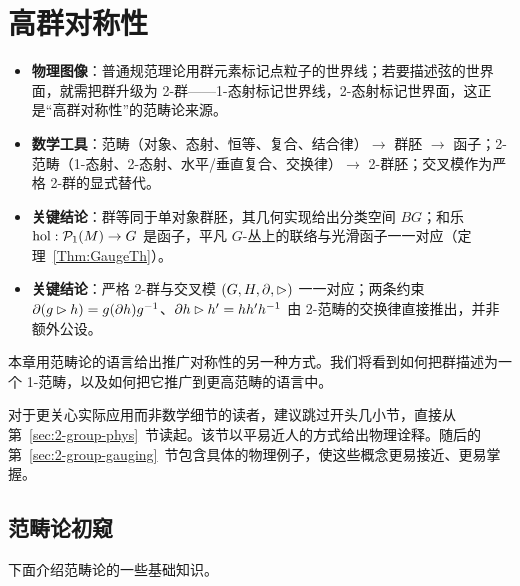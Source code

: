 
\section{高群对称性}\label{sec:higher-group}

\begin{keytakeaways}
  \begin{itemize}[leftmargin=1.4em,itemsep=2pt,topsep=2pt]
    \item \textbf{物理图像}：普通规范理论用群元素标记点粒子的世界线；若要描述弦的世界面，就需把群升级为 2-群——1-态射标记世界线，2-态射标记世界面，这正是“高群对称性”的范畴论来源。
    \item \textbf{数学工具}：范畴（对象、态射、恒等、复合、结合律）$\to$ 群胚 $\to$ 函子；2-范畴（1-态射、2-态射、水平/垂直复合、交换律）$\to$ 2-群胚；交叉模作为严格 2-群的显式替代。
    \item \textbf{关键结论}：群等同于单对象群胚，其几何实现给出分类空间 $BG$；和乐 ${\rm hol}:\mathcal{P}_1(M)\to G$ 是函子，平凡 $G$-丛上的联络与光滑函子一一对应（定理~\ref{Thm:GaugeTh}）。
    \item \textbf{关键结论}：严格 2-群与交叉模 $(G,H,\partial,\rhd)$ 一一对应；两条约束 $\partial(g\rhd h)=g(\partial h)g^{-1}$、$\partial h\rhd h'=hh'h^{-1}$ 由 2-范畴的交换律直接推出，并非额外公设。
  \end{itemize}
\end{keytakeaways}

本章用范畴论的语言给出推广对称性的另一种方式。我们将看到如何把群描述为一个 1-范畴，以及如何把它推广到更高范畴的语言中。

对于更关心实际应用而非数学细节的读者，建议跳过开头几小节，直接从第~\ref{sec:2-group-phys}~节读起。该节以平易近人的方式给出物理诠释。随后的第~\ref{sec:2-group-gauging}~节包含具体的物理例子，使这些概念更易接近、更易掌握。

\subsection{范畴论初窥}\label{App:Cat}
下面介绍范畴论的一些基础知识。

